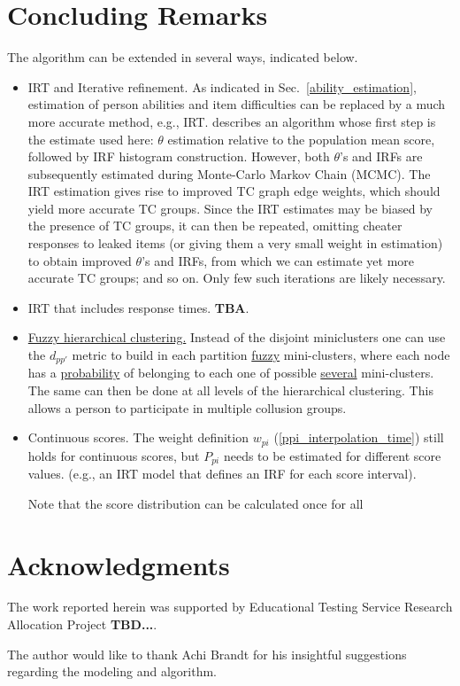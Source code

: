 \documentclass{article}
\begin{document}
\section{Concluding Remarks}
\label{remarks}
The algorithm can be extended in several ways, indicated below.
\begin{itemize}
	\item {IRT and Iterative refinement.} As indicated in Sec.~\ref{ability_estimation}, estimation of person abilities and item difficulties can be replaced by a much more accurate method, e.g., IRT. \cite{nirt} describes an algorithm whose first step is the estimate used here: $\theta$ estimation relative to the population mean score, followed by IRF histogram construction. However, both $\theta$'s and IRFs are subsequently estimated during Monte-Carlo Markov Chain (MCMC). The IRT estimation gives rise to improved TC graph edge weights, which should yield more accurate TC groups. Since the IRT estimates may be biased by the presence of TC groups, it can then be repeated, omitting cheater responses to leaked items (or giving them a very small weight in estimation) to obtain improved $\theta$'s and IRFs, from which we can estimate yet more accurate TC groups; and so on. Only few such iterations are likely necessary.
	\item {IRT that includes response times.} {\bf TBA}.
	\item \underline{Fuzzy hierarchical clustering.} Instead of the disjoint miniclusters one can use the $d_{pp'}$ metric to build in each partition \underline{fuzzy} mini-clusters, where each node has a \underline{probability} of belonging to each one of possible \underline{several} mini-clusters. The same can then be done at all levels of the hierarchical clustering. This allows a person to participate in multiple collusion groups.
	\item {Continuous scores.} The weight definition $w_{pi}$ (\ref{ppi_interpolation_time}) still holds for continuous scores, but $P_{pi}$ needs to be estimated for different score values. (e.g., an IRT model that defines an IRF for each score interval).
	 	
Note that the score distribution can be calculated once for all 

\end{itemize}

\section{Acknowledgments}
The work reported herein was supported by Educational Testing Service Research Allocation Project {\bf TBD...}.

The author would like to thank Achi Brandt for his insightful suggestions regarding the modeling and algorithm.



\end{document}

